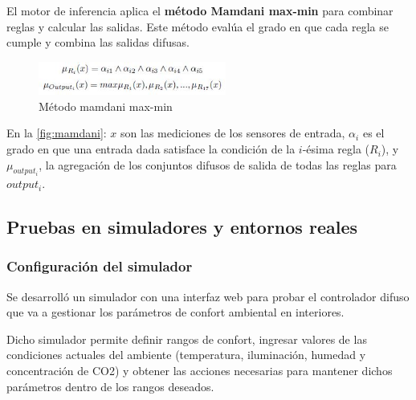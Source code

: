 El motor de inferencia aplica el \textbf{método Mamdani max-min} para combinar reglas y calcular las salidas. Este método evalúa el grado en que cada regla se cumple y combina las salidas difusas.

\begin{figure}[H]
	\centering
	\includegraphics[width=0.55\textwidth]{imgs/mamdani.JPG}
	\caption{Método mamdani max-min}
	\label{fig:mamdani}
\end{figure}

En la \autoref{fig:mamdani}: $x$ son las mediciones de los sensores de entrada, $\alpha_i$ es el grado en que una entrada dada satisface la condición de la $i$-ésima regla ($R_i$), y $\mu_{output_i}$, la agregación de los conjuntos difusos de salida de todas las reglas para $output_i$.

\subsection{Pruebas en simuladores y entornos reales}

\subsubsection{Configuración del simulador}

Se desarrolló un simulador con una interfaz web para probar el controlador difuso que va a gestionar los parámetros de confort ambiental en interiores.

Dicho simulador permite definir rangos de confort, ingresar valores de las condiciones actuales del ambiente (temperatura, iluminación, humedad y concentración de CO2) y obtener las acciones necesarias para mantener dichos parámetros dentro de los rangos deseados.

